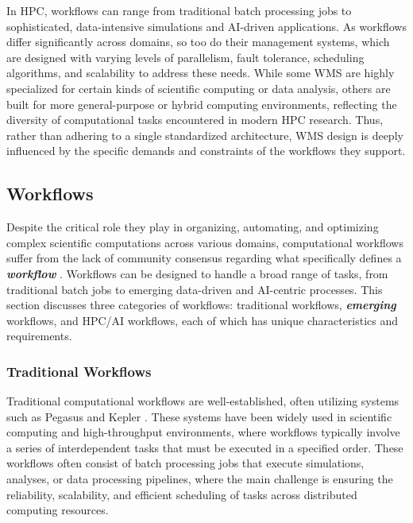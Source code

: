 In HPC, workflows can range from traditional batch processing jobs to sophisticated, data-intensive simulations and AI-driven applications. As workflows differ significantly across domains, so too do their management systems, which are designed with varying levels of parallelism, fault tolerance, scheduling algorithms, and scalability to address these needs. While some WMS are highly specialized for certain kinds of scientific computing or data analysis, others are built for more general-purpose or hybrid computing environments, reflecting the diversity of computational tasks encountered in modern HPC research. Thus, rather than adhering to a single standardized architecture, WMS design is deeply influenced by the specific demands and constraints of the workflows they support.


\subsection{Workflows}

Despite the critical role they play in organizing, automating, and optimizing complex scientific computations across various domains, computational workflows suffer from the lack of community consensus regarding what specifically defines a {\em\bf workflow} \citep{ferreira_da_silva2022, wilkinson2025}. Workflows can be designed to handle a broad range of tasks, from traditional batch jobs to emerging data-driven and AI-centric processes. This section discusses three categories of workflows: traditional workflows, {\em\bf emerging} workflows, and HPC/AI workflows, each of which has unique characteristics and requirements.

\subsubsection{Traditional Workflows}

Traditional computational workflows are well-established, often utilizing systems such as Pegasus \citep{www-pegasus} and Kepler \citep{www-kepler}. These systems have been widely used in scientific computing and high-throughput environments, where workflows typically involve a series of interdependent tasks that must be executed in a specified order. These workflows often consist of batch processing jobs that execute simulations, analyses, or data processing pipelines, where the main challenge is ensuring the reliability, scalability, and efficient scheduling of tasks across distributed computing resources.

